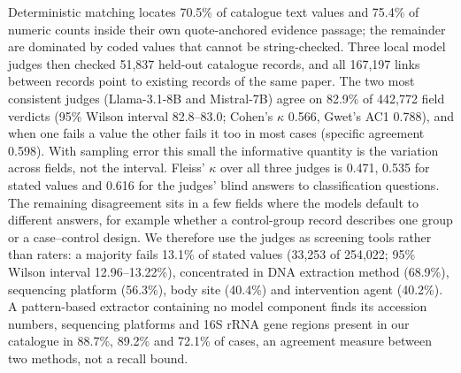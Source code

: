 \documentclass[referee,lineno,pdflatex,sn-vancouver-num]{sn-jnl}
\theoremstyle{thmstyleone}%
\theoremstyle{thmstyletwo}%
\theoremstyle{thmstylethree}%
\begin{document}
Deterministic matching locates 70.5\% of catalogue text values and
75.4\% of numeric counts inside their own quote-anchored evidence
passage; the remainder are dominated by coded
values that cannot be string-checked.
Three local model judges then checked 51,837 held-out catalogue records,
and all 167,197 links between records point to existing records of the
same paper. The two most consistent judges (Llama-3.1-8B and Mistral-7B)
agree on 82.9\% of 442,772 field verdicts (95\% Wilson interval
82.8--83.0; Cohen's $\kappa$ 0.566, Gwet's AC1 0.788), and when one fails a
value the other fails it too in most cases (specific agreement 0.598). With
sampling error this small the informative quantity is the variation across
fields, not the interval. Fleiss' $\kappa$ over all three judges is
0.471, 0.535 for stated values and 0.616 for the judges' blind answers to
classification questions. The remaining disagreement sits in a few fields
where the models default to different answers, for example whether a
control-group record describes one group or a case--control design. We
therefore use the judges as screening tools rather than raters: a majority
fails 13.1\% of stated values (33,253 of 254,022; 95\% Wilson interval
12.96--13.22\%), concentrated in DNA
extraction method (68.9\%), sequencing platform (56.3\%), body site
(40.4\%) and intervention agent (40.2\%). A pattern-based extractor containing no model component finds
its accession numbers, sequencing platforms and 16S rRNA gene regions present
in our catalogue in 88.7\%, 89.2\% and 72.1\% of cases, an agreement
measure between two methods, not a recall bound.
\end{document}
